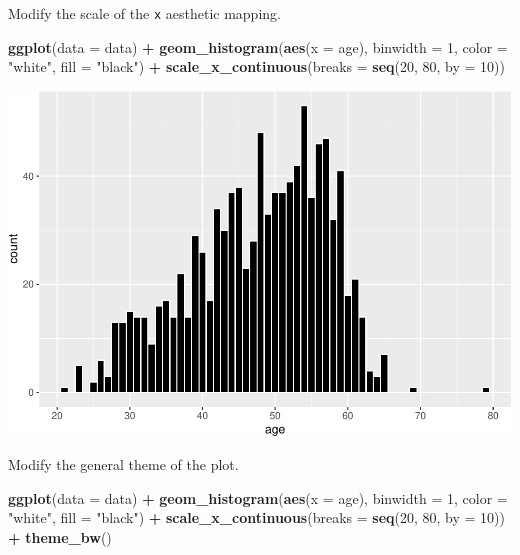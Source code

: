 \documentclass[
]{book}
\newenvironment{Shaded}{\begin{snugshade}}{\end{snugshade}}
\newcommand{\AttributeTok}[1]{\textcolor[rgb]{0.13,0.29,0.53}{#1}}
\newcommand{\DecValTok}[1]{\textcolor[rgb]{0.00,0.00,0.81}{#1}}
\newcommand{\FunctionTok}[1]{\textcolor[rgb]{0.13,0.29,0.53}{\textbf{#1}}}
\newcommand{\NormalTok}[1]{#1}
\newcommand{\SpecialCharTok}[1]{\textcolor[rgb]{0.81,0.36,0.00}{\textbf{#1}}}
\newcommand{\StringTok}[1]{\textcolor[rgb]{0.31,0.60,0.02}{#1}}
\begin{document}
Modify the scale of the \texttt{x} aesthetic mapping.

\begin{Shaded}
\begin{Highlighting}[]
\FunctionTok{ggplot}\NormalTok{(}\AttributeTok{data =}\NormalTok{ data) }\SpecialCharTok{+}
  \FunctionTok{geom\_histogram}\NormalTok{(}\FunctionTok{aes}\NormalTok{(}\AttributeTok{x =}\NormalTok{ age), }\AttributeTok{binwidth =} \DecValTok{1}\NormalTok{,}
                 \AttributeTok{color =} \StringTok{"white"}\NormalTok{, }\AttributeTok{fill =} \StringTok{"black"}\NormalTok{) }\SpecialCharTok{+}
  \FunctionTok{scale\_x\_continuous}\NormalTok{(}\AttributeTok{breaks =} \FunctionTok{seq}\NormalTok{(}\DecValTok{20}\NormalTok{, }\DecValTok{80}\NormalTok{, }\AttributeTok{by =} \DecValTok{10}\NormalTok{))}
\end{Highlighting}
\end{Shaded}

\includegraphics{R-for-social-research-and-business-analytics_files/figure-latex/unnamed-chunk-20-1.pdf}

Modify the general theme of the plot.

\begin{Shaded}
\begin{Highlighting}[]
\FunctionTok{ggplot}\NormalTok{(}\AttributeTok{data =}\NormalTok{ data) }\SpecialCharTok{+}
  \FunctionTok{geom\_histogram}\NormalTok{(}\FunctionTok{aes}\NormalTok{(}\AttributeTok{x =}\NormalTok{ age), }\AttributeTok{binwidth =} \DecValTok{1}\NormalTok{,}
                 \AttributeTok{color =} \StringTok{"white"}\NormalTok{, }\AttributeTok{fill =} \StringTok{"black"}\NormalTok{) }\SpecialCharTok{+}
  \FunctionTok{scale\_x\_continuous}\NormalTok{(}\AttributeTok{breaks =} \FunctionTok{seq}\NormalTok{(}\DecValTok{20}\NormalTok{, }\DecValTok{80}\NormalTok{, }\AttributeTok{by =} \DecValTok{10}\NormalTok{)) }\SpecialCharTok{+}
  \FunctionTok{theme\_bw}\NormalTok{()}
\end{Highlighting}
\end{Shaded}
\end{document}

